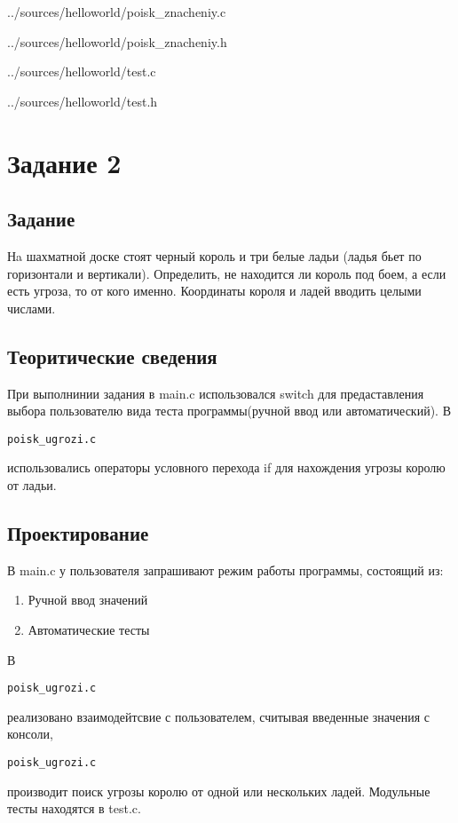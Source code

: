\documentclass[12pt,a4paper]{report}
\begin{document}

{../sources/helloworld/poisk_znacheniy.c}


{../sources/helloworld/poisk_znacheniy.h}


{../sources/helloworld/test.c}


{../sources/helloworld/test.h}



\section{Задание 2}
\subsection{Задание}
Нa шахматной доске стоят черный король и три белые ладьи (ладья бьет по горизонтали и вертикали). Определить, не находится ли король под боем, а если есть угроза, то от кого именно. Координаты короля и ладей вводить целыми числами.
\subsection{Теоритические сведения}
При выполнинии задания в main.c использовался switch для предаставления выбора пользователю вида теста программы(ручной ввод или автоматический). В \begin{verbatim}poisk_ugrozi.c \end{verbatim} использовались операторы условного перехода if для нахождения угрозы королю от ладьи.
\subsection{Проектирование}
В main.c у пользователя запрашивают режим работы программы, состоящий из:
\begin{enumerate}
\item Ручной ввод значений
\item Автоматические тесты
\end{enumerate}

В \begin{verbatim}poisk_ugrozi.c \end{verbatim}  реализовано взаимодейтсвие с пользователем, считывая введенные значения с консоли, \begin{verbatim}poisk_ugrozi.c \end{verbatim}  производит поиск угрозы королю от одной или нескольких ладей.
Модульные тесты находятся в test.c.
\end{document}
